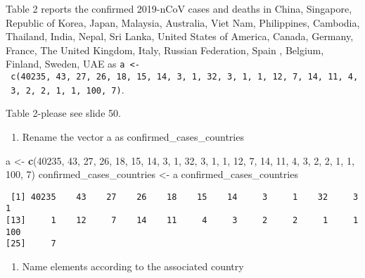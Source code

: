 \documentclass[]{article}
\newenvironment{Shaded}{\begin{snugshade}}{\end{snugshade}}
\newcommand{\DecValTok}[1]{\textcolor[rgb]{0.00,0.00,0.81}{#1}}
\newcommand{\KeywordTok}[1]{\textcolor[rgb]{0.13,0.29,0.53}{\textbf{#1}}}
\newcommand{\NormalTok}[1]{#1}
\newcommand{\StringTok}[1]{\textcolor[rgb]{0.31,0.60,0.02}{#1}}
\providecommand{\tightlist}{%
  \setlength{\itemsep}{0pt}\setlength{\parskip}{0pt}}
\begin{document}
Table 2 reports the confirmed 2019-nCoV cases and deaths in China,
Singapore, Republic of Korea, Japan, Malaysia, Australia, Viet Nam,
Philippines, Cambodia, Thailand, India, Nepal, Sri Lanka, United States
of America, Canada, Germany, France, The United Kingdom, Italy, Russian
Federation, Spain , Belgium, Finland, Sweden, UAE as
\texttt{a\ \textless{}-\ c(40235,\ 43,\ 27,\ 26,\ 18,\ 15,\ 14,\ 3,\ 1,\ 32,\ 3,\ 1,\ 1,\ 12,\ 7,\ 14,\ 11,\ 4,\ 3,\ 2,\ 2,\ 1,\ 1,\ 100,\ 7)}.

Table 2-please see slide 50.

\begin{enumerate}
\def\labelenumi{\roman{enumi})}
\tightlist
\item
  Rename the vector a as confirmed\_cases\_countries
\end{enumerate}

\begin{Shaded}
\begin{Highlighting}[]
\NormalTok{a <-}\StringTok{ }\KeywordTok{c}\NormalTok{(}\DecValTok{40235}\NormalTok{, }\DecValTok{43}\NormalTok{, }\DecValTok{27}\NormalTok{, }\DecValTok{26}\NormalTok{, }\DecValTok{18}\NormalTok{, }\DecValTok{15}\NormalTok{, }\DecValTok{14}\NormalTok{, }\DecValTok{3}\NormalTok{, }\DecValTok{1}\NormalTok{, }\DecValTok{32}\NormalTok{, }\DecValTok{3}\NormalTok{, }\DecValTok{1}\NormalTok{, }\DecValTok{1}\NormalTok{, }\DecValTok{12}\NormalTok{, }\DecValTok{7}\NormalTok{, }\DecValTok{14}\NormalTok{, }\DecValTok{11}\NormalTok{, }\DecValTok{4}\NormalTok{, }\DecValTok{3}\NormalTok{, }\DecValTok{2}\NormalTok{, }\DecValTok{2}\NormalTok{, }\DecValTok{1}\NormalTok{, }\DecValTok{1}\NormalTok{, }\DecValTok{100}\NormalTok{, }\DecValTok{7}\NormalTok{)}
\NormalTok{confirmed_cases_countries <-}\StringTok{ }\NormalTok{a}
\NormalTok{confirmed_cases_countries}
\end{Highlighting}
\end{Shaded}

\begin{verbatim}
 [1] 40235    43    27    26    18    15    14     3     1    32     3     1
[13]     1    12     7    14    11     4     3     2     2     1     1   100
[25]     7
\end{verbatim}

\begin{enumerate}
\def\labelenumi{\roman{enumi})}
\setcounter{enumi}{1}
\tightlist
\item
  Name elements according to the associated country
\end{enumerate}
\end{document}

